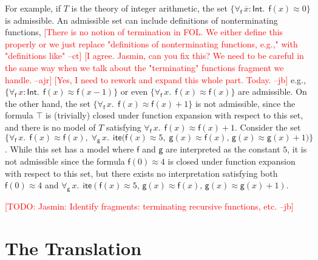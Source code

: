 \documentclass[runningheads,a4paper]{llncs}
\newcommand{\con}[1]{\mathsf{#1}}
\renewcommand\vec[1]{\overline{#1}}
\newcommand{\teq}{\approx}
\newcommand{\typeint}{\ty{Int}}
\newcommand\ty[1]{\con{#1}}
\newcommand{\ltrue}{\top}
\newcommand{\lite}{\con{ite}}
\newcommand{\forallf}[1]{\forall_{\!#1\:}}
\newcommand{\rem}[1]{\textcolor{red}{[#1]}}
\newcommand{\ajr}[1]{\rem{#1 --ajr}}
\newcommand{\jb}[1]{\rem{#1 --jb}}
\newcommand{\ct}[1]{\rem{#1 --ct}}
\begin{document}
For example, if $T$ is the theory of integer arithmetic,
the set $\{ \forallf{\con{f}} \vec x:\typeint.\;\, \con{f}( x ) \teq 0 \}$ is admissible.
An admissible set can include definitions of nonterminating functions,
\ct{There is no notion of termination in FOL. We either define this properly or we just replace "definitions of nonterminating functions, e.g.," with "definitions like"}
\ajr{I agree. Jasmin, can you fix this?  We need to be careful in the same way when we talk about the "terminating" functions fragment we handle.}
\jb{Yes, I need to rework and expand this whole part. Today.}
e.g.,
$\{ \forallf{\con{f}} x : \typeint.\;\, \con{f}( x ) \teq \con{f}( x - 1 ) \}$ or even $\{ \forallf{\con{f}} x.\allowbreak\;\, \con{f}( x ) \teq \con{f}( x ) \}$ are admissible.
On the other hand, the set $\{ \forallf{\con{f}} x.\;\, \con{f}( x ) \teq \con{f}( x ) + 1 \}$ is not admissible,
since the formula $\ltrue$ is (trivially) closed under function expansion with respect to this set,
and there is no model of $T$ satisfying $\forallf{\con{f}} x.\;\, \con{f}( x ) \teq \con{f}( x ) + 1$.
Consider the set 
$\{ 
 \forallf{\con{f}} x.\;\, \con{f}( x ) \teq \con{f}( x ),\;
 \forallf{\con{g}} x.\;\, \lite\bigl( \con{f}( x ) \teq 5,\;
   \con{g}( x ) \teq \con{f}( x ),\,
   \con{g}( x ) \teq \con{g}( x ) + 1)
\}$.
While this set has a model where $\con f$ and $\con g$ are interpreted as the constant $5$, it is not admissible
since the formula $\con{f}( 0 ) \teq 4$ is closed under function expansion with respect to this set,
but there exists no interpretation satisfying both $\con{f}( 0 ) \teq 4$ and $\forallf{\con{g}} x.\;\, \lite( \con{f}( x ) \teq 5,\, \con{g}( x ) \teq \con{f}( x ),\, \con{g}( x ) \teq \con{g}( x ) + 1 )$.


\jb{TODO: Jasmin: Identify fragments: terminating recursive functions, etc.}


\section{The Translation}
\label{sec:encoding}

\newcommand{\itemx}{\itemindent5em\item}
\end{document}
